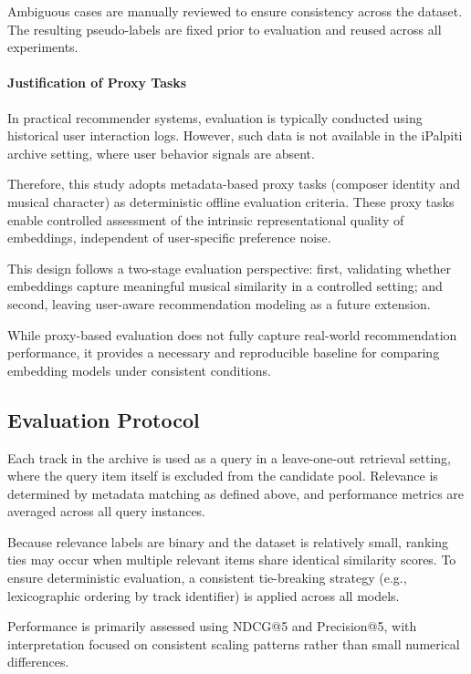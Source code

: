 \documentclass{article}
\begin{document}
Ambiguous cases are manually reviewed to ensure consistency across the dataset.
The resulting pseudo-labels are fixed prior to evaluation and reused across all experiments.

\paragraph{Justification of Proxy Tasks}
In practical recommender systems, evaluation is typically conducted using historical user interaction logs.
However, such data is not available in the iPalpiti archive setting, where user behavior signals are absent.

Therefore, this study adopts metadata-based proxy tasks (composer identity and musical character)
as deterministic offline evaluation criteria.
These proxy tasks enable controlled assessment of the intrinsic representational quality of embeddings,
independent of user-specific preference noise.

This design follows a two-stage evaluation perspective:
first, validating whether embeddings capture meaningful musical similarity in a controlled setting;
and second, leaving user-aware recommendation modeling as a future extension.

While proxy-based evaluation does not fully capture real-world recommendation performance,
it provides a necessary and reproducible baseline for comparing embedding models under consistent conditions.

\subsection{Evaluation Protocol}

Each track in the archive is used as a query in a leave-one-out retrieval setting, where the query
item itself is excluded from the candidate pool. Relevance is determined by metadata matching as
defined above, and performance metrics are averaged across all query instances.

Because relevance labels are binary and the dataset is relatively small, ranking ties may occur when
multiple relevant items share identical similarity scores. To ensure deterministic evaluation, a
consistent tie-breaking strategy (e.g., lexicographic ordering by track identifier) is applied across
all models.

Performance is primarily assessed using NDCG@5 and Precision@5, with interpretation focused on
consistent scaling patterns rather than small numerical differences.
\end{document}

